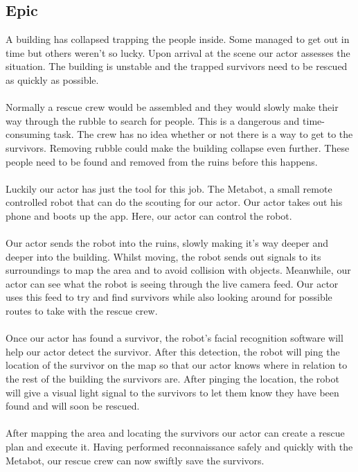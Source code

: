 \documentclass[12pt]{article}
\begin{document}
	\subsection{Epic}
	 A building has collapsed trapping the people inside. Some managed to get out in time but others weren't so lucky. Upon arrival at the scene our actor assesses the situation. The building is unstable and the trapped survivors need to be rescued as quickly as possible.\\
	 \\Normally a rescue crew would be assembled and they would slowly make their way through the rubble to search for people. This is a dangerous and time-consuming task. The crew has no idea whether or not there is a way to get to the survivors. Removing rubble could make the building collapse even further. These people need to be found and removed from the ruins before this happens.\\
	 \\Luckily our actor has just the tool for this job. The Metabot, a small remote controlled robot that can do the scouting for our actor. Our actor takes out his phone and boots up the app. Here, our actor can control the robot.\\
	 \\Our actor sends the robot into the ruins, slowly making it's way deeper and deeper into the building. Whilst moving, the robot sends out signals to its surroundings to map the area and to avoid collision with objects. Meanwhile, our actor can see what the robot is seeing through the live camera feed. Our actor uses this feed to try and find survivors while also looking around for possible routes to take with the rescue crew.\\
	 \\Once our actor has found a survivor, the robot's facial recognition software will help our actor detect the survivor. After this detection, the robot will ping the location of the survivor on the map so that our actor knows where in relation to the rest of the building the survivors are. After pinging the location, the robot will give a visual light signal to the survivors to let them know they have been found and will soon be rescued.\\
	 \\After mapping the area and locating the survivors our actor can create a rescue plan and execute it. Having performed reconnaissance safely and quickly with the Metabot, our rescue crew can now swiftly save the survivors. 
	 \newpage
\end{document}
